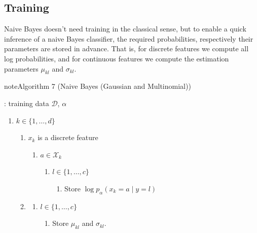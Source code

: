 \documentclass[letterpaper,10pt,english]{jupyterBook}
\begin{document}
\subsection{Training}
\label{\detokenize{classification_naive_bayes:id1}}
\sphinxAtStartPar
Naive Bayes doesn’t need training in the classical sense, but to enable a quick inference of a naive Bayes classifier, the required probabilities, respectively their parameters are stored in advance. That is, for discrete features we compute all log probabilities, and for continuous features we compute the estimation parameters \(\mu_{kl}\) and \(\sigma_{kl}\).
\label{classification_naive_bayes:algorithm-6}
\begin{sphinxadmonition}{note}{Algorithm 7 (Naive Bayes (Gaussian and Multinomial))}



\sphinxAtStartPar
{}: training data \(\mathcal{D}\), \(\alpha\)
\begin{enumerate}
%
\item {} 
\sphinxAtStartPar
{} \(k\in\{1,\ldots,d\}\)
\begin{enumerate}
%
\item {} 
\sphinxAtStartPar
{} \(x_k\) is a discrete feature
\begin{enumerate}
%
\item {} 
\sphinxAtStartPar
{} \(a\in\mathcal{X}_k\)
\begin{enumerate}
%
\item {} 
\sphinxAtStartPar
{} \(l\in\{1,\ldots, c\}\)
\begin{enumerate}
%
\item {} 
\sphinxAtStartPar
Store \(\log p_\alpha(x_k=a\mid y=l)\)

\end{enumerate}

\end{enumerate}

\end{enumerate}

\item {} 
\sphinxAtStartPar
{}
\begin{enumerate}
%
\item {} 
\sphinxAtStartPar
{} \(l\in\{1,\ldots, c\}\)
\begin{enumerate}
%
\item {} 
\sphinxAtStartPar
Store \(\mu_{kl}\) and \(\sigma_{kl}\).


\end{enumerate}
\end{enumerate}
\end{enumerate}
\end{enumerate}
\end{sphinxadmonition}
\end{document}

